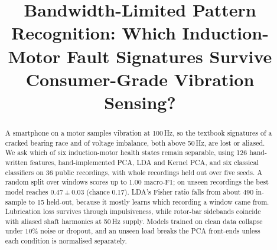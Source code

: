 \documentclass[conference]{IEEEtran}
\begin{document}
\title{Bandwidth-Limited Pattern Recognition: Which Induction-Motor Fault Signatures
Survive Consumer-Grade Vibration Sensing?}

\author{
}

\maketitle

\begin{abstract}
A smartphone on a motor samples vibration at 100\,Hz, so the textbook signatures of a cracked
bearing race and of voltage imbalance, both above 50\,Hz, are lost or aliased. We ask which of
six induction-motor health states remain separable, using 126 hand-written features,
hand-implemented PCA, LDA and Kernel PCA, and six classical classifiers on 36 public recordings,
with whole recordings held out over five seeds. A random split over windows scores up to 1.00
macro-F1; on unseen recordings the best model reaches $0.47 \pm 0.03$ (chance 0.17). LDA's
Fisher ratio falls from about 490 in-sample to 15 held-out, because it mostly learns which
recording a window came from. Lubrication loss survives through impulsiveness, while rotor-bar
sidebands coincide with aliased shaft harmonics at 50\,Hz supply. Models trained on clean data
collapse under 10\% noise or dropout, and an unseen load breaks the PCA front-ends unless each
condition is normalised separately.
\end{abstract}








\end{document}
